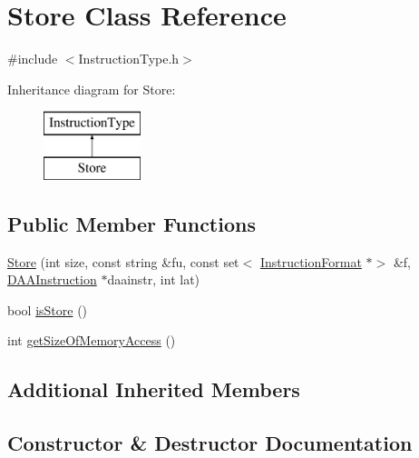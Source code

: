 \hypertarget{classStore}{}\section{Store Class Reference}
\label{classStore}


{\ttfamily \#include $<$Instruction\+Type.\+h$>$}

Inheritance diagram for Store\+:\begin{figure}[H]
\begin{center}
\leavevmode
\includegraphics[height=2.000000cm]{classStore}
\end{center}
\end{figure}
\subsection*{Public Member Functions}
\begin{DoxyCompactItemize}
\item 
\hyperlink{classStore_af7bb7bf7ccfd067bb6a29fd454f1b8c4}{Store} (int size, const string \&fu, const set$<$ \hyperlink{classInstructionFormat}{Instruction\+Format} $\ast$$>$ \&f, \hyperlink{classDAAInstruction}{D\+A\+A\+Instruction} $\ast$daainstr, int lat)
\item 
bool \hyperlink{classStore_a773c447c4ac4b781ea6d18d91ff3dd50}{is\+Store} ()
\item 
int \hyperlink{classStore_a1b788e1fc3364a4eb304a2611ad37415}{get\+Size\+Of\+Memory\+Access} ()
\end{DoxyCompactItemize}
\subsection*{Additional Inherited Members}


\subsection{Constructor \& Destructor Documentation}
\mbox{\label{classStore_af7bb7bf7ccfd067bb6a29fd454f1b8c4}} 
